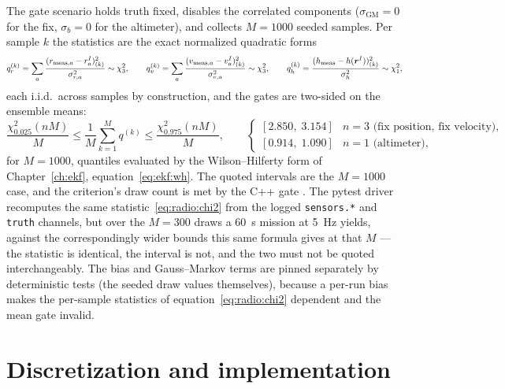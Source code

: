 The gate scenario holds truth fixed, disables the correlated components
($\sigma_{\mathrm{GM}} = 0$ for the fix, $\sigma_b = 0$ for the
altimeter), and collects $M = 1000$ seeded samples. Per sample $k$ the
statistics are the exact normalized quadratic forms
\begin{equation}
  q^{(k)}_{r} = \sum_{a}
    \frac{(r_{\mathrm{meas},a} - r^{I}_a)^2_{(k)}}{\sigma_{r,a}^2}
    \sim \chi^2_3,
  \qquad
  q^{(k)}_{v} = \sum_{a}
    \frac{(v_{\mathrm{meas},a} - v^{I}_a)^2_{(k)}}{\sigma_{v,a}^2}
    \sim \chi^2_3,
  \qquad
  q^{(k)}_{h} =
    \frac{(h_{\mathrm{meas}} - h(\bm{r}^{I}))^2_{(k)}}{\sigma_{h}^2}
    \sim \chi^2_1,
  \label{eq:radio:chi2}
\end{equation}
each i.i.d.\ across samples by construction, and the gates are two-sided
on the ensemble means:
\begin{equation}
  \frac{\chi^2_{0.025}(nM)}{M} \le \frac{1}{M} \sum_{k=1}^{M} q^{(k)}
    \le \frac{\chi^2_{0.975}(nM)}{M},
  \qquad
  \begin{cases}
    [2.850,\; 3.154] & n = 3 \text{ (fix position, fix velocity)},\\[2pt]
    [0.914,\; 1.090] & n = 1 \text{ (altimeter)},
  \end{cases}
  \label{eq:radio:bounds}
\end{equation}
for $M = 1000$, quantiles evaluated by the Wilson--Hilferty form of
Chapter~\ref{ch:ekf}, equation~\eqref{eq:ekf:wh}. The quoted intervals are
the $M = 1000$ case, and the criterion's draw count is met by the C++ gate
. The pytest
driver recomputes the same statistic~\eqref{eq:radio:chi2} from the logged
\texttt{sensors.*} and \texttt{truth} channels, but over the $M = 300$
draws a \qty{60}{\second} mission at \qty{5}{\hertz} yields, against the
correspondingly wider bounds this same formula gives at that $M$ --- the
statistic is identical, the interval is not, and the two must not be
quoted interchangeably. The bias and
Gauss--Markov terms are pinned separately by deterministic tests (the
seeded draw values themselves), because a per-run bias makes the
per-sample statistics of equation~\eqref{eq:radio:chi2} dependent and
the mean gate invalid.

\section{Discretization and implementation}
\label{sec:radio:implementation}

